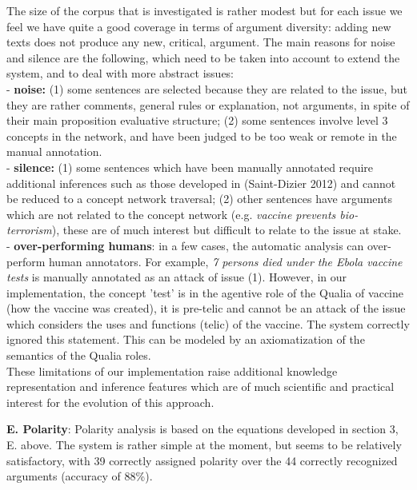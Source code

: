\documentclass[11pt,letterpaper]{article}
\begin{document}
The size of the corpus that is investigated is rather modest but for each issue we feel we have quite a good coverage in terms of argument diversity: adding new texts does not produce any new, critical, argument.  The main reasons for noise and silence are the following, which need to be taken into account to extend the system, and to deal with more abstract issues:\\
- {\bf noise:} (1) some sentences are selected because they are related to the issue, but they are rather comments, general rules or explanation, not arguments, in spite of their main proposition evaluative structure; (2) some sentences involve level 3 concepts in the network, and have been judged to be too weak or remote in the manual annotation.\\
- {\bf silence:} (1) some sentences which have been manually annotated require additional inferences such as those developed in (Saint-Dizier 2012) and cannot be reduced to a concept network traversal; (2) other sentences have arguments which are not related to the concept network (e.g. {\it vaccine prevents bio-terrorism}), these are of much interest but difficult to relate to the issue at stake.\\
- {\bf over-performing humans}: in a few cases, the automatic analysis can over-perform human annotators. For example, {\it 7 persons died under the Ebola vaccine tests} is manually annotated as an attack of issue (1). However, in our implementation, the concept 'test' is in the agentive role of the Qualia of vaccine (how the vaccine was created),  it is pre-telic 
and cannot be an attack of the issue which considers the uses and functions (telic) of the vaccine. The system correctly ignored this statement. This can be modeled by an axiomatization of the semantics of the Qualia roles.\\
These limitations of our implementation raise additional knowledge representation and inference features which are of much scientific and practical interest for the evolution of this approach.


{\bf E. Polarity}:
Polarity analysis is based on the equations developed in section 3, E. above. The system is rather simple at the moment, but seems to be relatively satisfactory, with 39 correctly assigned polarity over the 44 correctly recognized arguments (accuracy of 88\%).
\end{document}
